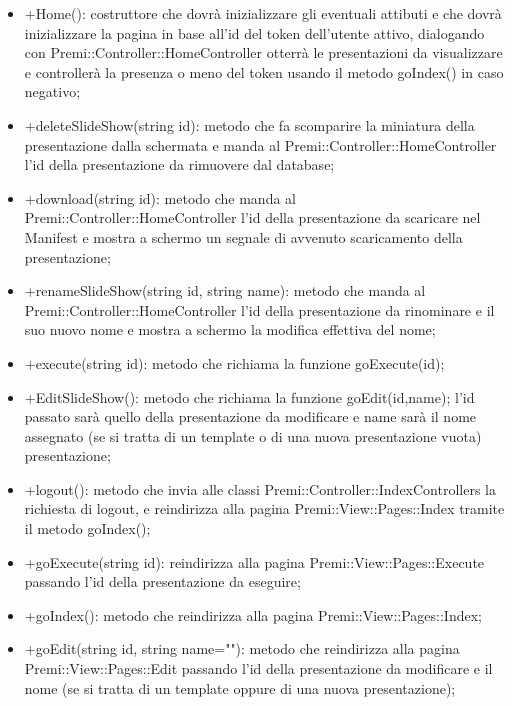 {{\begin{itemize}
							\item +Home(): costruttore che dovrà inizializzare gli eventuali attibuti e che dovrà inizializzare la pagina in base all'id del token dell'utente attivo, dialogando con Premi::Controller::HomeController otterrà le presentazioni da visualizzare e controllerà la presenza o meno del token usando il metodo goIndex() in caso negativo;
							\item +deleteSlideShow(string id): metodo che fa scomparire la miniatura della presentazione dalla schermata e manda al Premi::Controller::HomeController l'id della presentazione da rimuovere dal database;
							\item +download(string id): metodo che manda al Premi::Controller::HomeController l'id della presentazione da scaricare nel Manifest e mostra a schermo un segnale di avvenuto scaricamento della presentazione;
							\item +renameSlideShow(string id, string name): metodo che manda al Premi::Controller::HomeController l'id della presentazione da rinominare e il suo nuovo nome e mostra a schermo la modifica effettiva del nome;
							\item +execute(string id): metodo che richiama la funzione goExecute(id);
							\item +EditSlideShow(): metodo che richiama la funzione goEdit(id,name); l'id passato sarà quello della presentazione da modificare e name sarà il nome assegnato (se si tratta di un template o di una nuova presentazione vuota) presentazione;
							\item +logout(): metodo che invia alle classi Premi::Controller::IndexControllers la richiesta di logout, e reindirizza alla pagina Premi::View::Pages::Index tramite il metodo goIndex();
							\item +goExecute(string id): reindirizza alla pagina Premi::View::Pages::Execute passando l'id della presentazione da eseguire;		
							\item +goIndex(): metodo che reindirizza alla pagina Premi::View::Pages::Index;
							\item +goEdit(string id, string name=""): metodo che reindirizza alla pagina Premi::View::Pages::Edit passando l'id della presentazione da modificare e il nome (se si tratta di un template oppure di una nuova presentazione);
						\end{itemize}
					}
}
